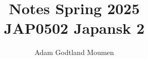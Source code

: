 \documentclass[11pt,a4paper]{article}
\title{Notes Spring 2025\\ \normalsize JAP0502 Japansk 2}
\author{Adam Godtland Moumen}
\begin{document}
\begin{titlepage}
    \maketitle
\end{titlepage}
\tableofcontents
\clearpage
{}


\end{document}
